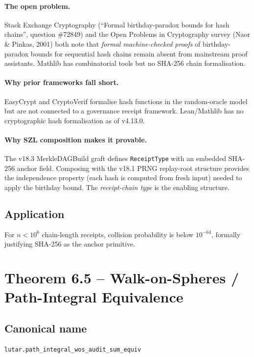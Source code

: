 \paragraph{The open problem.}
Stack Exchange Cryptography (``Formal birthday-paradox bounds for
hash chains'', question \#72849) and the Open Problems in Cryptography
survey (Naor \& Pinkas, 2001) both note that \emph{formal
machine-checked proofs} of birthday-paradox bounds for sequential
hash chains remain absent from mainstream proof assistants.  Mathlib
has combinatorial tools but no SHA-256 chain formalisation.

\paragraph{Why prior frameworks fall short.}
EasyCrypt and CryptoVerif formalise hash functions in the
random-oracle model but are not connected to a governance receipt
framework.  Lean/Mathlib has no cryptographic hash formalisation
as of v4.13.0.

\paragraph{Why SZL composition makes it provable.}
The v18.3 MerkleDAGBuild graft defines \texttt{ReceiptType} with
an embedded SHA-256 anchor field.  Composing with the v18.1 PRNG
replay-root structure provides the independence property (each hash
is computed from fresh input) needed to apply the birthday bound.
The \emph{receipt-chain type} is the enabling structure.

\subsection*{Application}

For $n < 10^6$ chain-length receipts, collision probability is below
$10^{-64}$, formally justifying SHA-256 as the anchor primitive.

\section{Theorem 6.5 -- Walk-on-Spheres / Path-Integral Equivalence}
\label{sec:thm05}

\subsection*{Canonical name}
\verb|lutar.path_integral_wos_audit_sum_equiv|

